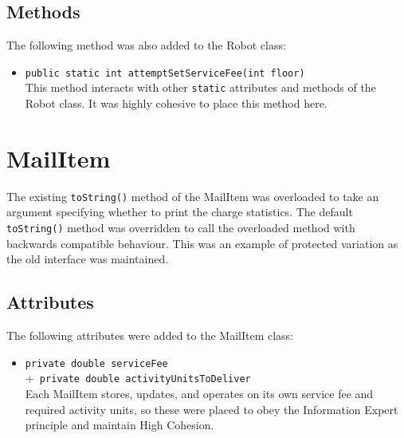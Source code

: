 \documentclass{article}
\begin{document}
\subsection{Methods}
The following method was also added to the Robot class:
\begin{itemize}
    \item \verb|public static int attemptSetServiceFee(int floor)|\\[2mm]
    This method interacts with other \verb|static| attributes and methods of the Robot class. It was highly cohesive to place this method here.
\end{itemize}

\section{MailItem}
The existing \verb|toString()| method of the MailItem was overloaded to take an argument specifying whether to print the charge statistics. The default \verb|toString()| method was overridden to call the overloaded method with backwards compatible behaviour. This was an example of protected variation as the old interface was maintained.
\subsection{Attributes}
The following attributes were added to the MailItem class:
\begin{itemize}
    \item \verb|private double serviceFee|\\
         +\verb| private double activityUnitsToDeliver|\\[2mm]
    Each MailItem stores, updates, and operates on its own service fee and required activity units, so these were placed to obey the Information Expert principle and maintain High Cohesion.
\end{itemize}
\end{document}
